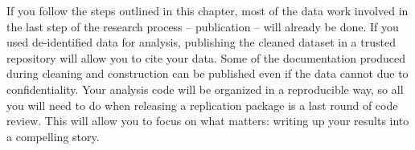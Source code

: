 If you follow the steps outlined in this chapter,
most of the data work involved in the last step of the research process
-- publication -- will already be done.
If you used de-identified data for analysis,
publishing the cleaned dataset in a trusted repository will allow you to cite your data.
Some of the documentation produced during cleaning and construction can be published
even if the data cannot due to confidentiality.
Your analysis code will be organized in a reproducible way,
so all you will need to do when releasing a replication package is a last round of code review.
This will allow you to focus on what matters:
writing up your results into a compelling story.

